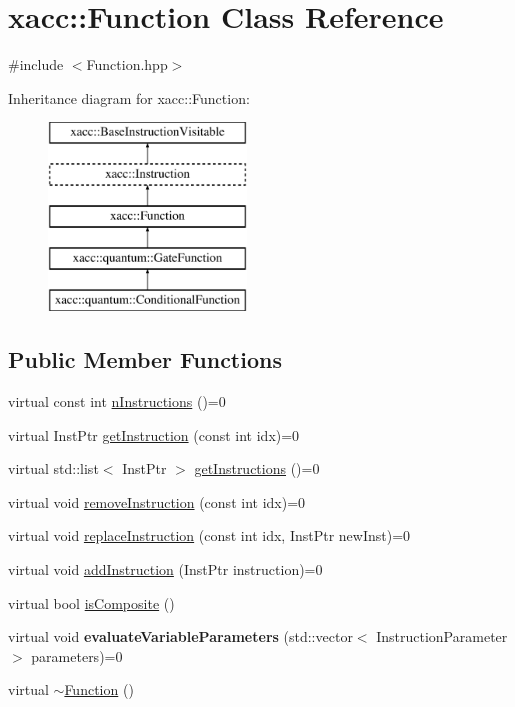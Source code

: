 \hypertarget{a00106}{}\section{xacc\+:\+:Function Class Reference}
\label{a00106}


{\ttfamily \#include $<$Function.\+hpp$>$}

Inheritance diagram for xacc\+:\+:Function\+:\begin{figure}[H]
\begin{center}
\leavevmode
\includegraphics[height=5.000000cm]{a00106}
\end{center}
\end{figure}
\subsection*{Public Member Functions}
\begin{DoxyCompactItemize}
\item 
virtual const int \hyperlink{a00106_a8901985525f59713e14c61713e07c086}{n\+Instructions} ()=0
\item 
virtual Inst\+Ptr \hyperlink{a00106_afa549fc91b5a05f26d8139954a7e0ed5}{get\+Instruction} (const int idx)=0
\item 
virtual std\+::list$<$ Inst\+Ptr $>$ \hyperlink{a00106_aaf80bd3d49113a92b520785572663032}{get\+Instructions} ()=0
\item 
virtual void \hyperlink{a00106_ab6478b09bb28e194bb555b3180737733}{remove\+Instruction} (const int idx)=0
\item 
virtual void \hyperlink{a00106_a2ef6a4923a6734f90f6ee3d94d263af0}{replace\+Instruction} (const int idx, Inst\+Ptr new\+Inst)=0
\item 
virtual void \hyperlink{a00106_aa8c9ec2d08be75c69399d4254b0216f5}{add\+Instruction} (Inst\+Ptr instruction)=0
\item 
virtual bool \hyperlink{a00106_aa75500c657b5c3e0e36213e1506aad97}{is\+Composite} ()
\item 
virtual void {\bfseries evaluate\+Variable\+Parameters} (std\+::vector$<$ Instruction\+Parameter $>$ parameters)=0\hypertarget{a00106_af6ae9453027789a2aaec30e59c9e45e3}{}\label{a00106_af6ae9453027789a2aaec30e59c9e45e3}

\item 
virtual \hyperlink{a00106_a04b25ba4da1ddfa4ec4ec6d6ffb25bc3}{$\sim$\+Function} ()
\end{DoxyCompactItemize}
